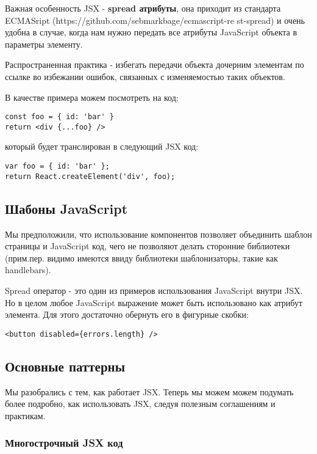 Важная особенность JSX - \textbf{spread атрибуты}, она приходит из стандарта ECMASript (https://github.com/sebmarkbage/ecmascript-re st-spread) и очень удобна в случае, когда нам нужно передать все атрибуты JavaScript объекта в параметры элементу.

Распространенная практика - избегать передачи объекта дочерним элементам по ссылке во избежании ошибок, связанных с изменяемостью таких объектов.

В качестве примера можем посмотреть на код:

\begin{lstlisting}
const foo = { id: 'bar' }
return <div {...foo} />
\end{lstlisting}
   
который будет транслирован в следующий JSX код:

\begin{lstlisting}
var foo = { id: 'bar' };
return React.createElement('div', foo);
\end{lstlisting}
   
\subsection{Шабоны JavaScript}

Мы предположили, что использование компонентов позволяет объединить шаблон страницы и JavaScript код, чего не позволяют делать сторонние библиотеки (прим.пер. видимо имеются ввиду библиотеки шаблонизаторы, такие как handlebars).

Spread оператор - это один из примеров использования JavaScript внутри JSX. Но в целом любое JavaScript выражение может быть использовано как атрибут элемента. Для этого достаточно обернуть его в фигурные скобки:

\begin{lstlisting}
<button disabled={errors.length} />
\end{lstlisting}

\subsection{Основные паттерны}

Мы разобрались с тем, как работает JSX. Теперь мы можем можем подумать более подробно, как использовать JSX, следуя полезным соглашениям и практикам.

\subsubsection{Многострочный JSX код}


